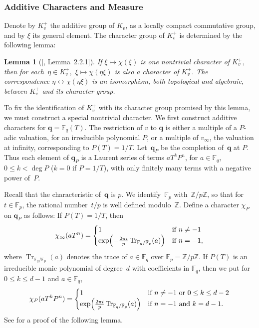 \documentclass{amsart}
\newcommand\Z{\mathbb{Z}}	\newcommand\C{\mathbb{C}}
\newcommand\F{\mathbb{F}}
\newcommand\q{\mathbf{q}}
\newcommand\Tr{\operatorname{Tr}}
\newtheorem{lemma}[theorem]{Lemma}
\theoremstyle{definition}\newtheorem{definition}[theorem]{Definition}
\theoremstyle{remark}\newtheorem{remark}[theorem]{Remark}
\numberwithin{equation}{section}
\begin{document}
\subsubsection{Additive Characters and Measure}

Denote by $K_v^+$ the additive group of $K_v$,
as a locally compact commutative group,
and by $\xi$ its general element.
The character group of $K_v^+$ is determined by the following lemma:

\begin{lemma}[{[, Lemma~2.2.1]}]\label{L:chars}
If\/ $\xi\mapsto\chi(\xi)$ is one nontrivial character of\/ $K_v^+,$
then for each\/~$\eta\in K_v^+,$
$\xi\mapsto\chi(\eta\xi)$ is also a character of\/ $K_v^+$.
The correspondence $\eta\longleftrightarrow\chi(\eta\xi)$ is an isomorphism,
both topological and algebraic,
between $K_v^+$ and its character group.
\end{lemma}

To fix the identification of $K_v^+$ with its character group promised by this lemma,
we must construct a special nontrivial character.
We first construct additive characters for $\q=\F_q(T)$.
The restriction of $v$ to $\q$ is either a multiple of a $P$-adic valuation,
for an irreducible polynomial $P$,
or a multiple of $v_\infty$,
the valuation at infinity,
corresponding to $P(T)=1/T$.
Let~$\q_P$ be the completion of~$\q$ at $P$.
Thus each element of $\q_P$ is a Laurent series of terms $aT^kP^n$,
for $a\in\F_q$,
$0\leq k<\deg P$ ($k=0$ if $P=1/T$),
with only finitely many terms with a negative power of~$P$.

Recall that the characteristic of~$\q$ is $p$.
We identify~$\F_p$ with~$\Z/p\Z$,
so that for $t\in\F_p$,
the rational number~$t/p$ is well defined modulo~$\Z$.
Define a character $\chi_P$ on $\q_P$ as follows:
If $P(T)=1/T$,
then
\begin{gather}\label{E:chiinfty}
\chi_\infty(aT^n)=\begin{cases}
1			&\text{if }n\neq-1\\
\exp\Bigl(-\frac{2\pi i}p\Tr_{\F_q/\F_p}(a)\Bigr)&\text{if }n=-1,
\end{cases}
\end{gather}
where $\Tr_{\F_q/\F_p}(a)$ denotes the trace of $a\in\F_q$ over $\F_p=\Z/p\Z$.
If $P(T)$ is an irreducible monic polynomial of degree~$d$ with coefficients in $\F_q$,
then we put for $0\leq k\leq d-1$ and $a\in\F_q$,
\begin{gather}\label{E:chiP}
\chi_P(aT^kP^n)=\begin{cases}
1			&\text{if $n\neq-1$ or }0\leq k\leq d-2\\
\exp\Bigl(\frac{2\pi i}p\Tr_{\F_q/\F_p}(a)\Bigr)	&\text{if $n=-1$ and }k=d-1.
\end{cases}
\end{gather}
See \cite[Lemma~2.2.2]{Tate} for a proof of the following lemma.
\end{document}
